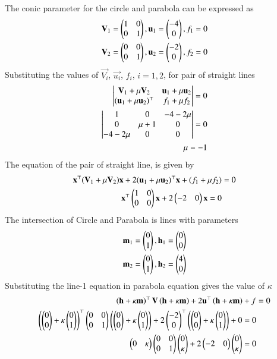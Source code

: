 \documentclass[journal]{IEEEtran}
\begin{document}
The conic parameter for the circle and parabola  can be expressed as 
\begin{align}
    \mathbf{V}_1 = \begin{pmatrix}1 & 0 \\ 0 & 1\end{pmatrix}, \mathbf{u}_1 = \begin{pmatrix}-4 \\ 0\end{pmatrix}, f_1 = 0 \\
    \mathbf{V}_2 = \begin{pmatrix}0 & 0 \\ 0 &1\end{pmatrix}, \mathbf{u}_2 = \begin{pmatrix}-2 \\ 0\end{pmatrix}, f_2 = 0
\end{align}
Substituting the values of $\vec{V_i}$, $\vec{u_i}$, $f_i$, $i = 1, 2$, for pair of straight lines\\
\begin{align}
 \begin{vmatrix}\mathbf{V}_1 + \mu\mathbf{V}_2 & \mathbf{u}_1 + \mu\mathbf{u}_2 \\ (\mathbf{u}_1+ \mu\mathbf{u}_2)^\top & f_1 + \mu f_2\end{vmatrix} = 0 \\
 \begin{vmatrix}1 & 0 & -4 -2\mu \\ 0 & \mu + 1 & 0 \\ -4-2\mu & 0 & 0\end{vmatrix} = 0   \\
 \mu = -1
\end{align}
The equation of the pair of straight line, is given by
\begin{align}
    \mathbf{x}^\top (\mathbf{V}_1+\mu\mathbf{V}_2)\mathbf{x}+2(\mathbf{u}_1 + \mu \mathbf{u}_2)^\top \mathbf{x} + (f_1 + \mu f_2) &= 0 \\
    \mathbf{x}^\top \begin{pmatrix}1 & 0 \\ 0 & 0\end{pmatrix}\mathbf{x}+2\begin{pmatrix}-2 & 0\end{pmatrix} \mathbf{x}   = 0 
\end{align}
The intersection of Circle and Parabola is lines with parameters
\begin{align}
\mathbf{m}_1 = \begin{pmatrix}0 \\ 1\end{pmatrix}, \mathbf{h}_1 = \begin{pmatrix}0 \\ 0\end{pmatrix} \\
\mathbf{m}_2 = \begin{pmatrix}0 \\ 1\end{pmatrix}, \mathbf{h}_2 = \begin{pmatrix}4 \\ 0\end{pmatrix}
\end{align}
Substituting the line-1 equation in parabola equation gives the value of $\kappa$
\begin{align}
\left(\mathbf{h}+\kappa\mathbf{m}\right)^\top\mathbf{V}\left(\mathbf{h}+\kappa\mathbf{m}\right) + 2\mathbf{u}^\top\left(\mathbf{h}+\kappa\mathbf{m}\right) + f &= 0 \\
\left(\begin{pmatrix}0 \\ 0\end{pmatrix} + \kappa \begin{pmatrix}0\\1\end{pmatrix}\right)^\top \begin{pmatrix} 0&0\\0&1\end{pmatrix}\left(\begin{pmatrix}0 \\ 0\end{pmatrix}+ \kappa \begin{pmatrix}0\\1\end{pmatrix}\right) + 2\begin{pmatrix}-2\\0\end{pmatrix}^\top \left(\begin{pmatrix}0 \\ 0\end{pmatrix} + \kappa \begin{pmatrix}0\\1\end{pmatrix}\right) + 0 = 0 \\
\begin{pmatrix}0 & \kappa\end{pmatrix}\begin{pmatrix}0 & 0 \\ 0 &1\end{pmatrix}\begin{pmatrix}0 \\ \kappa\end{pmatrix} + 2\begin{pmatrix}-2 & 0\end{pmatrix}\begin{pmatrix}0 \\ \kappa\end{pmatrix} = 0
\end{align}
\end{document}
